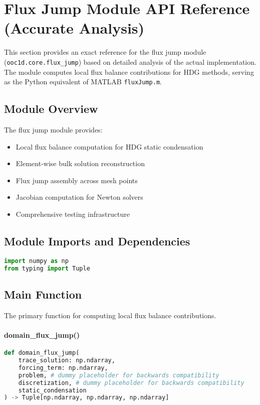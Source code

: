 %

\section{Flux Jump Module API Reference (Accurate Analysis)}
\label{sec:flux_jump_module_api}

This section provides an exact reference for the flux jump module (\texttt{ooc1d.core.flux\_jump}) based on detailed analysis of the actual implementation. The module computes local flux balance contributions for HDG methods, serving as the Python equivalent of MATLAB \texttt{fluxJump.m}.

\subsection{Module Overview}

The flux jump module provides:
\begin{itemize}
    \item Local flux balance computation for HDG static condensation
    \item Element-wise bulk solution reconstruction
    \item Flux jump assembly across mesh points
    \item Jacobian computation for Newton solvers
    \item Comprehensive testing infrastructure
\end{itemize}

\subsection{Module Imports and Dependencies}

\begin{lstlisting}[language=Python, caption=Module Dependencies]
import numpy as np
from typing import Tuple
\end{lstlisting}

\subsection{Main Function}
\label{subsec:domain_flux_jump_function}

The primary function for computing local flux balance contributions.

\paragraph{domain\_flux\_jump()}
\begin{lstlisting}[language=Python, caption=Domain Flux Jump Function]
def domain_flux_jump(
    trace_solution: np.ndarray,
    forcing_term: np.ndarray,
    problem, # dummy placeholder for backwards compatibility
    discretization, # dummy placeholder for backwards compatibility
    static_condensation
) -> Tuple[np.ndarray, np.ndarray, np.ndarray]
\end{lstlisting}

